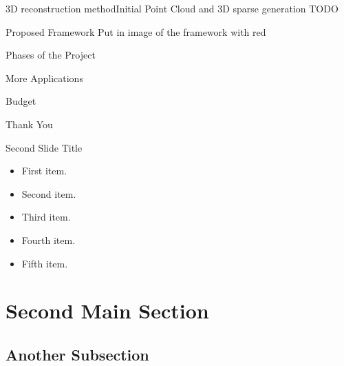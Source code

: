 \documentclass{beamer}
\begin{document}
\begin{frame}{3D reconstruction method}{Initial Point Cloud and 3D sparse generation}
  TODO
\end{frame}

\begin{frame}{Proposed Framework}{}
  Put in image of the framework with red
\end{frame}

\begin{frame}{Phases of the Project}{}
\end{frame}

\begin{frame}{More Applications}{}
\end{frame}

\begin{frame}{Budget}{}
\end{frame}


\begin{frame}
\vfill
\begin{center}
\huge{Thank You}
\end{center}
\vfill
\end{frame}

\begin{frame}{Second Slide Title}
  \begin{itemize}
  \item {
    First item.
    \pause %
  }
  \item {   
    Second item.
  }
  \item<3-> {
    Third item.
  }
  \item<4-> {
    Fourth item.
  }
  \item<5-> {
    Fifth item. 
  }
  \end{itemize}
\end{frame}

\section{Second Main Section}

\subsection{Another Subsection}
\end{document}
